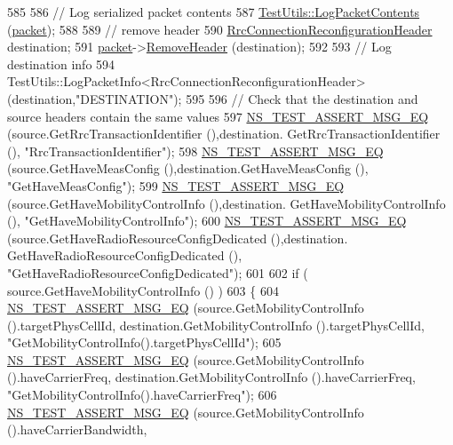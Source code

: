 \begin{DoxyCode}
585 
586   \textcolor{comment}{// Log serialized packet contents}
587   \hyperlink{classTestUtils_a9391dac3282094e6e57c0052d88a086f}{TestUtils::LogPacketContents} (\hyperlink{classRrcHeaderTestCase_a6f0748c0e845f797497fbda1ca781803}{packet});
588 
589   \textcolor{comment}{// remove header}
590   \hyperlink{classns3_1_1RrcConnectionReconfigurationHeader}{RrcConnectionReconfigurationHeader} destination;
591   \hyperlink{classRrcHeaderTestCase_a6f0748c0e845f797497fbda1ca781803}{packet}->\hyperlink{classns3_1_1Packet_a0961eccf975d75f902d40956c93ba63e}{RemoveHeader} (destination);
592 
593   \textcolor{comment}{// Log destination info}
594   TestUtils::LogPacketInfo<RrcConnectionReconfigurationHeader> (destination,\textcolor{stringliteral}{"DESTINATION"});
595 
596   \textcolor{comment}{// Check that the destination and source headers contain the same values}
597   \hyperlink{group__testing_ga2a9d78cffb3db8e867c35fff0b698cf5}{NS\_TEST\_ASSERT\_MSG\_EQ} (source.GetRrcTransactionIdentifier (),destination.
      GetRrcTransactionIdentifier (), \textcolor{stringliteral}{"RrcTransactionIdentifier"});
598   \hyperlink{group__testing_ga2a9d78cffb3db8e867c35fff0b698cf5}{NS\_TEST\_ASSERT\_MSG\_EQ} (source.GetHaveMeasConfig (),destination.GetHaveMeasConfig (),
       \textcolor{stringliteral}{"GetHaveMeasConfig"});
599   \hyperlink{group__testing_ga2a9d78cffb3db8e867c35fff0b698cf5}{NS\_TEST\_ASSERT\_MSG\_EQ} (source.GetHaveMobilityControlInfo (),destination.
      GetHaveMobilityControlInfo (), \textcolor{stringliteral}{"GetHaveMobilityControlInfo"});
600   \hyperlink{group__testing_ga2a9d78cffb3db8e867c35fff0b698cf5}{NS\_TEST\_ASSERT\_MSG\_EQ} (source.GetHaveRadioResourceConfigDedicated (),destination.
      GetHaveRadioResourceConfigDedicated (), \textcolor{stringliteral}{"GetHaveRadioResourceConfigDedicated"});
601 
602   \textcolor{keywordflow}{if} ( source.GetHaveMobilityControlInfo () )
603     \{
604       \hyperlink{group__testing_ga2a9d78cffb3db8e867c35fff0b698cf5}{NS\_TEST\_ASSERT\_MSG\_EQ} (source.GetMobilityControlInfo ().targetPhysCellId,
      destination.GetMobilityControlInfo ().targetPhysCellId, \textcolor{stringliteral}{"GetMobilityControlInfo().targetPhysCellId"});
605       \hyperlink{group__testing_ga2a9d78cffb3db8e867c35fff0b698cf5}{NS\_TEST\_ASSERT\_MSG\_EQ} (source.GetMobilityControlInfo ().haveCarrierFreq,
      destination.GetMobilityControlInfo ().haveCarrierFreq, \textcolor{stringliteral}{"GetMobilityControlInfo().haveCarrierFreq"});
606       \hyperlink{group__testing_ga2a9d78cffb3db8e867c35fff0b698cf5}{NS\_TEST\_ASSERT\_MSG\_EQ} (source.GetMobilityControlInfo ().haveCarrierBandwidth,

\end{DoxyCode}
